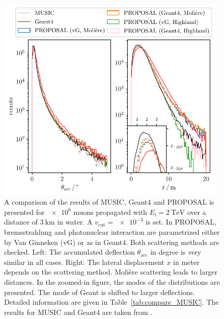 \documentclass[pdflatex, sn-mathphys]{sn-jnl}%
\theoremstyle{thmstyleone}%
\theoremstyle{thmstyletwo}%
\theoremstyle{thmstylethree}%
\begin{document}
\begin{figure}
    \centering 
    \includegraphics[width=0.98\textwidth]{../../deflection/plots/FINAL/2TeV_1e6events_accumulated_defl_paper_combined_zoom.pdf}
    \caption{A comparison of the results of MUSIC, Geant4 and PROPOSAL is presented for $\num{e6}$ muons propagated with 
    $E_{\text{i}} = \SI{2}{\tera\electronvolt}$ over a distance of 
    $\SI{3}{\kilo\meter}$ in water. A $v_{\mathrm{cut}} = \num{e-3}$ is set. In PROPOSAL, 
    bremsstrahlung and photonuclear interaction are parametrized either by 
    Van Ginneken (vG) or as in Geant4. Both scattering methods are checked. 
    Left: The accumulated deflection $\theta_{\mathrm{acc}}$ in degree is very similar in all cases.
    Right: The lateral displacement $x$ in meter depends 
    on the scattering method. Molière scattering leads to larger distances.
    In the zoomed-in figure, the modes of the distributions are presented. 
    The mode of Geant is shifted to larger deflections.
    Detailed information are given in 
    Table~\ref{tab:compare_MUSIC}. The results for MUSIC and Geant4 are taken from 
    \cite{comparison_MUSIC_GEANT4_2009}.}
    \label{fig:compare_MUSIC}
\end{figure}
\end{document}
